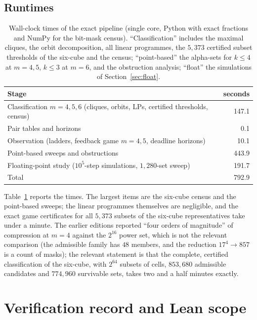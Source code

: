 \documentclass[11pt,a4paper]{article}
\theoremstyle{plain}
\theoremstyle{definition}
\theoremstyle{remark}
\begin{document}
\subsection{Runtimes}
\begin{table}[t]
\centering\small
\caption{Wall-clock times of the exact pipeline (single core, Python with exact fractions and NumPy for the bit-mask census). ``Classification'' includes the maximal cliques, the orbit decomposition, all linear programmes, the $5{,}373$ certified subset thresholds of the six-cube and the census; ``point-based'' the alpha-sets for $k\le4$ at $m=4,5$, $k\le3$ at $m=6$, and the obstruction analysis; ``float'' the simulations of Section~\ref{sec:float}.}
\label{tab:runtime}
\begin{tabular}{lr}
\toprule
Stage & seconds\\
\midrule
Classification $m=4,5,6$ (cliques, orbits, LPs, certified thresholds, census) & 147.1\\
Pair tables and horizons & 0.1\\
Observation (ladders, feedback game $m=4,5$, deadline horizons) & 10.1\\
Point-based sweeps and obstructions & 443.9\\
Floating-point study ($10^5$-step simulations, $1{,}280$-set sweep) & 191.7\\
Total & 792.9\\
\bottomrule
\end{tabular}
\end{table}
Table~\ref{tab:runtime} reports the times. The largest items are the six-cube census and the point-based sweeps; the linear programmes themselves are negligible, and the exact game certificates for all $5{,}373$ subsets of the six-cube representatives take under a minute. The earlier editions reported ``four orders of magnitude'' of compression at $m=4$ against the $2^{16}$ power set, which is not the relevant comparison (the admissible family has $48$ members, and the reduction $17^4\to857$ is a count of masks); the relevant statement is that the complete, certified classification of the six-cube, with $2^{64}$ subsets of cells, $853{,}680$ admissible candidates and $774{,}960$ survivable sets, takes two and a half minutes exactly.
\section{Verification record and Lean scope}\label{sec:verification}
\end{document}
